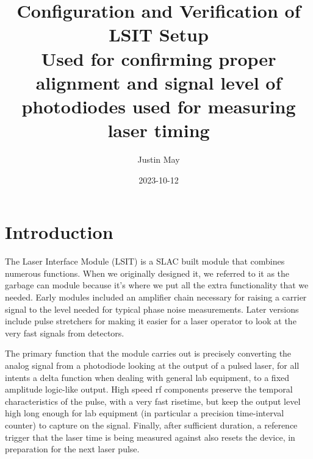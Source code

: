 \documentclass{article}
\title{Configuration and Verification of LSIT Setup \\
\large Used for confirming proper alignment and signal level of photodiodes used for measuring laser timing}
\author{Justin May}
\date{2023-10-12}
\begin{document}
\maketitle

\section{Introduction}
The Laser Interface Module (LSIT) is a SLAC built module that combines numerous functions. When we originally designed it, we referred to it as the garbage can module because it's where we put all the extra functionality that we needed. Early modules included an amplifier chain necessary for raising a carrier signal to the level needed for typical phase noise measurements. Later versions include pulse stretchers for making it easier for a laser operator to look at the very fast signals from detectors.

The primary function that the module carries out is precisely converting the analog signal from a photodiode looking at the output of a pulsed laser, for all intents a delta function when dealing with general lab equipment, to a fixed amplitude logic-like output. High speed rf components preserve the temporal characteristics of the pulse, with a very fast risetime, but keep the output level high long enough for lab equipment (in particular a precision time-interval counter) to capture on the signal. Finally, after sufficient duration, a reference trigger that the laser time is being measured against also resets the device, in preparation for the next laser pulse.
\end{document}
